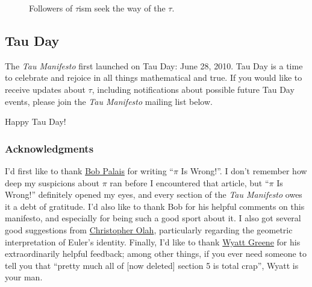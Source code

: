\documentclass{article}
\begin{document}
\begin{figure}
\begin{center}
\end{center}
\caption{Followers of $\tau$ism seek the way of the $\tau$.\label{fig:tauism}}
\end{figure}

  \subsection{Tau Day} %
  \label{sec:tau_day}
  

The \emph{Tau Manifesto} first launched on Tau Day: June 28, 2010. Tau Day is a time to celebrate and rejoice in all things mathematical and true. If you would like to receive updates about $\tau$, including notifications about possible future Tau Day events, please join the \emph{Tau Manifesto} mailing list below.

Happy Tau Day!







  \subsubsection{Acknowledgments} %
  \label{sec:acknowledgments}
    
I'd first like to thank \href{http://www.math.utah.edu/~palais/}{Bob Palais} for writing ``$\pi$ Is Wrong!''. I don't remember how deep my suspicions about $\pi$ ran before I encountered that article, but ``$\pi$ Is Wrong!'' definitely opened my eyes, and every section of the \emph{Tau Manifesto} owes it a debt of gratitude. I'd also like to thank Bob for his helpful comments on this manifesto, and especially for being such a good sport about it. I also got several good suggestions from \href{http://christopherolah.wordpress.com/}{Christopher Olah}, particularly regarding the geometric interpretation of Euler's identity. Finally, I'd like to thank \href{http://techiferous.com/}{Wyatt Greene} for his extraordinarily helpful feedback; among other things, if you ever need someone to tell you that ``pretty much all of [now deleted] section 5 is total crap'', Wyatt is your man.
\end{document}
